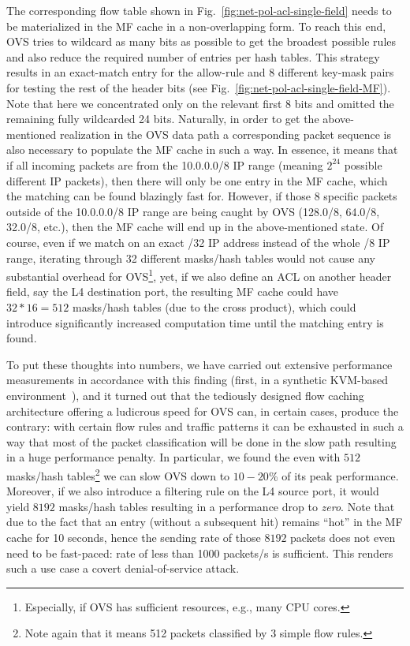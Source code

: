 \documentclass[a4paper,10pt]{article}
\begin{document}
The corresponding flow table shown in Fig.~\ref{fig:net-pol-acl-single-field} needs to be materialized in the MF cache in a non-overlapping form.
To reach this end, OVS tries to wildcard as many bits as possible to get the broadest possible rules and also reduce the required number of entries per hash tables.
This strategy results in an exact-match entry for the allow-rule and 8 different key-mask pairs for testing the rest of the header bits (see Fig.~\ref{fig:net-pol-acl-single-field-MF}).
Note that here we concentrated only on the relevant first 8 bits and omitted the remaining fully wildcarded 24 bits.
Naturally, in order to get the above-mentioned realization in the OVS data path a corresponding packet sequence is also necessary to populate the MF cache in such a way.
In essence, it means that if all incoming packets are from the 10.0.0.0/8 IP range (meaning $2^{24}$ possible different IP packets), then there will only be one entry in the MF cache, which the matching can be found blazingly fast for.
However, if those 8 specific packets outside of the 10.0.0.0/8 IP range are being caught by OVS (128.0/8, 64.0/8, 32.0/8, etc.), then the MF cache will end up in the above-mentioned state.
Of course, even if we match on an exact /32 IP address instead of the whole /8 IP range, iterating through 32 different masks/hash tables would not cause any substantial overhead for OVS\footnote{Especially, if OVS has sufficient resources, e.g., many CPU cores.}, yet, if we also define an ACL on another header field, say the L4 destination port, the resulting MF cache could have $32*16=512$ masks/hash tables (due to the cross product), which could introduce significantly increased computation time until the matching entry is found.

To put these thoughts into numbers, we have carried out extensive performance measurements in accordance with this finding (first, in a synthetic KVM-based environment~\cite{Csikor:2018:PIC:3234200.3234250}), and it turned out that the tediously designed flow caching architecture offering a ludicrous speed for OVS can, in certain cases, produce the contrary: with certain flow rules and traffic patterns it can be exhausted in such a way that most of the packet classification will be done in the slow path resulting in a huge performance penalty.
In particular, we found the even with $512$ masks/hash tables\footnote{Note again that it means 512 packets classified by 3 simple flow rules.} we can slow OVS down to $10-20$\% of its peak performance.
Moreover, if we also introduce a filtering rule on the L4 source port, it would yield $8192$ masks/hash tables resulting in a performance drop to \textit{zero}.
Note that due to the fact that an entry (without a subsequent hit) remains ``hot'' in the MF cache for 10 seconds, hence the sending rate of those $8192$ packets does not even need to be fast-paced: rate of less than 1000 packets/s is sufficient. 
This renders such a use case a covert denial-of-service attack.
\end{document}
